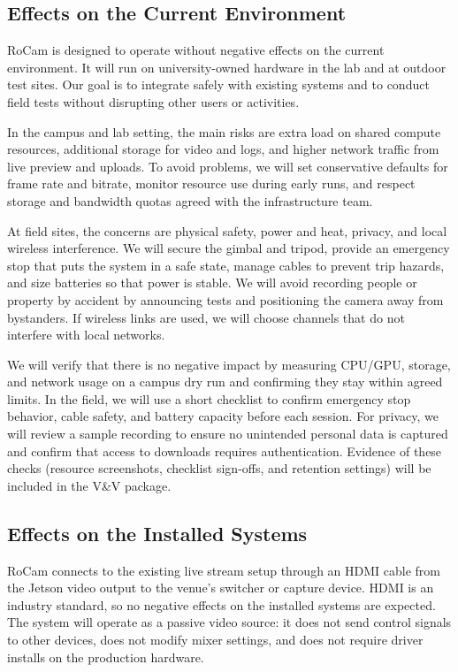 \documentclass[12pt]{article}
\begin{document}
\subsection{Effects on the Current Environment}

RoCam is designed to operate without negative effects on the current environment. It will run on university-owned hardware in the lab and at outdoor test sites. Our goal is to integrate safely with existing systems and to conduct field tests without disrupting other users or activities.

In the campus and lab setting, the main risks are extra load on shared compute resources, additional storage for video and logs, and higher network traffic from live preview and uploads. To avoid problems, we will set conservative defaults for frame rate and bitrate, monitor resource use during early runs, and respect storage and bandwidth quotas agreed with the infrastructure team.

At field sites, the concerns are physical safety, power and heat, privacy, and local wireless interference. We will secure the gimbal and tripod, provide an emergency stop that puts the system in a safe state, manage cables to prevent trip hazards, and size batteries so that power is stable. We will avoid recording people or property by accident by announcing tests and positioning the camera away from bystanders. If wireless links are used, we will choose channels that do not interfere with local networks.

We will verify that there is no negative impact by measuring CPU/GPU, storage, and network usage on a campus dry run and confirming they stay within agreed limits. In the field, we will use a short checklist to confirm emergency stop behavior, cable safety, and battery capacity before each session. For privacy, we will review a sample recording to ensure no unintended personal data is captured and confirm that access to downloads requires authentication. Evidence of these checks (resource screenshots, checklist sign-offs, and retention settings) will be included in the V\&V package.


\subsection{Effects on the Installed Systems}

RoCam connects to the existing live stream setup through an HDMI cable from the Jetson video output to the venue’s switcher or capture device. HDMI is an industry standard, so no negative effects on the installed systems are expected. The system will operate as a passive video source: it does not send control signals to other devices, does not modify mixer settings, and does not require driver installs on the production hardware.
\end{document}
